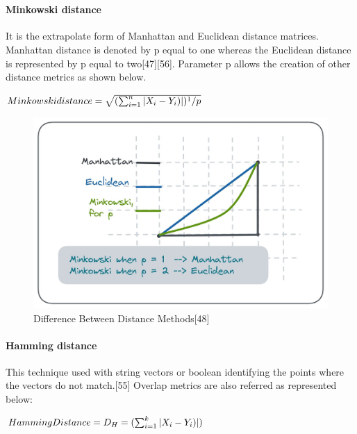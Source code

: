 \documentclass[conference]{IEEEtran}
\begin{document}
\

\paragraph{\textbf{Minkowski distance}}
It is the extrapolate form of Manhattan and Euclidean distance matrices. Manhattan distance is denoted by p equal to one whereas the Euclidean distance is represented by p equal to two[47][56]. Parameter p allows the creation of other distance metrics as shown below.

\begin{math}
 Minkowski distance =\sqrt{(\sum_{i=1}^{n} |X_{i} - Y_{i})|)^1/p}
 \newline
\end{math}

\begin{figure}
    \centering
    \includegraphics[width=0.8\linewidth]{b.jpg}
    \caption{Difference Between Distance Methods[48]}
    \label{fig:enter-label}
\end{figure}

\paragraph{\textbf{Hamming distance}}
This technique used with string vectors or boolean identifying the points where the vectors do not match.[55] Overlap metrics are also referred as represented below:

\begin{math}
 Hamming Distance = D_{H}=(\sum_{i=1}^{k} |X_{i} - Y_{i})|)
 \newline
\end{math}
\end{document}
